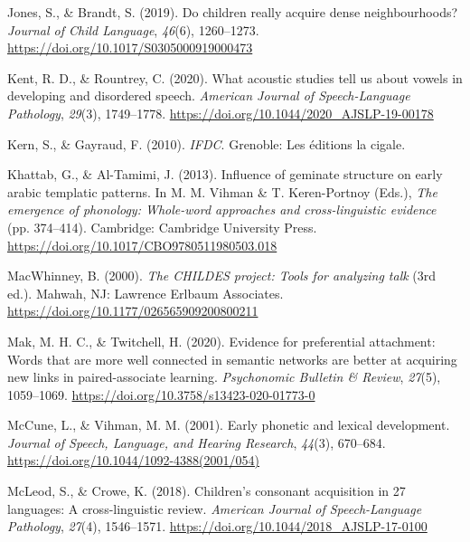 \documentclass[
  man]{apa6}
\newlength{\cslhangindent}
\newlength{\cslentryspacingunit} %
\newenvironment{CSLReferences}[2] %
 {%
  \setlength{\parindent}{0pt}
  \ifodd #1
  \let\oldpar\par
  \def\par{\hangindent=\cslhangindent\oldpar}
  \fi
  \setlength{\parskip}{#2\cslentryspacingunit}
 }%
 {}
\begin{document}
\begin{CSLReferences}{1}{0}
\leavevmode{}%
Jones, S., \& Brandt, S. (2019). Do children really acquire dense neighbourhoods? \emph{Journal of Child Language}, \emph{46}(6), 1260--1273. \url{https://doi.org/10.1017/S0305000919000473}

\leavevmode{}%
Kent, R. D., \& Rountrey, C. (2020). What acoustic studies tell us about vowels in developing and disordered speech. \emph{American Journal of Speech-Language Pathology}, \emph{29}(3), 1749--1778. \url{https://doi.org/10.1044/2020_AJSLP-19-00178}

\leavevmode{}%
Kern, S., \& Gayraud, F. (2010). \emph{{IFDC}}. Grenoble: Les éditions la cigale.

\leavevmode{}%
Khattab, G., \& Al-Tamimi, J. (2013). Influence of geminate structure on early arabic templatic patterns. In M. M. Vihman \& T. Keren-Portnoy (Eds.), \emph{The emergence of phonology: Whole-word approaches and cross-linguistic evidence} (pp. 374--414). Cambridge: Cambridge University Press. \url{https://doi.org/10.1017/CBO9780511980503.018}

\leavevmode{}%
MacWhinney, B. (2000). \emph{The {CHILDES} project: Tools for analyzing talk} (3rd ed.). Mahwah, {NJ}: Lawrence Erlbaum Associates. \url{https://doi.org/10.1177/026565909200800211}

\leavevmode{}%
Mak, M. H. C., \& Twitchell, H. (2020). Evidence for preferential attachment: Words that are more well connected in semantic networks are better at acquiring new links in paired-associate learning. \emph{Psychonomic Bulletin \& Review}, \emph{27}(5), 1059--1069. \url{https://doi.org/10.3758/s13423-020-01773-0}

\leavevmode{}%
McCune, L., \& Vihman, M. M. (2001). Early phonetic and lexical development. \emph{Journal of Speech, Language, and Hearing Research}, \emph{44}(3), 670--684. \url{https://doi.org/10.1044/1092-4388(2001/054)}

\leavevmode{}%
McLeod, S., \& Crowe, K. (2018). Children's consonant acquisition in 27 languages: A cross-linguistic review. \emph{American Journal of Speech-Language Pathology}, \emph{27}(4), 1546--1571. \url{https://doi.org/10.1044/2018_AJSLP-17-0100}


\end{CSLReferences}
\end{document}
